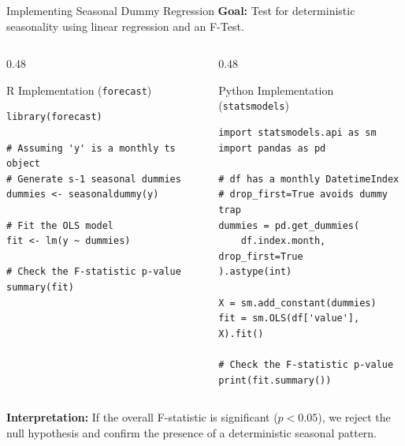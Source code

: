 \documentclass[aspectratio=169]{beamer}
\begin{document}
\begin{frame}[fragile]{Implementing Seasonal Dummy Regression}
\small
\textbf{Goal:} Test for deterministic seasonality using linear regression and an F-Test.

\vspace{0.2cm}

\begin{columns}[T]
\begin{column}{0.48\textwidth}
\begin{block}{R Implementation (\texttt{forecast})}
\begin{verbatim}
library(forecast)

# Assuming 'y' is a monthly ts object
# Generate s-1 seasonal dummies
dummies <- seasonaldummy(y)

# Fit the OLS model
fit <- lm(y ~ dummies)

# Check the F-statistic p-value
summary(fit) 
\end{verbatim}
\end{block}
\end{column}

\begin{column}{0.48\textwidth}
\begin{block}{Python Implementation (\texttt{statsmodels})}
\begin{verbatim}
import statsmodels.api as sm
import pandas as pd

# df has a monthly DatetimeIndex
# drop_first=True avoids dummy trap
dummies = pd.get_dummies(
    df.index.month, drop_first=True
).astype(int)

X = sm.add_constant(dummies)
fit = sm.OLS(df['value'], X).fit()

# Check the F-statistic p-value
print(fit.summary())
\end{verbatim}
\end{block}
\end{column}
\end{columns}
\end{frame}
\begin{frame}
\vspace{0.3cm}
\textbf{Interpretation:} If the overall F-statistic is significant ($p < 0.05$), we reject the null hypothesis and confirm the presence of a deterministic seasonal pattern.
\end{frame}
\end{document}
